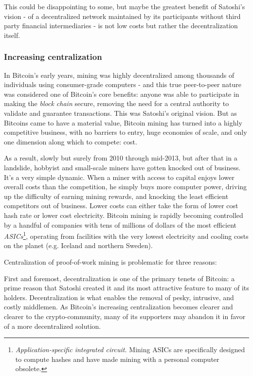 \documentclass[a4paper,11pt]{article}
\begin{document}
This could be disappointing to some, but maybe the greatest benefit of Satoshi's vision - of a decentralized network maintained by its participants without third party financial intermediaries - is not low costs but rather the decentralization itself.

\subsubsection{Increasing centralization}

In Bitcoin's early years, mining was highly decentralized among thousands of individuals using consumer-grade computers - and this true peer-to-peer nature was considered one of Bitcoin's core benefits: anyone was able to participate in making the \textit{block chain} secure, removing the need for a central authority to validate and guarantee transactions. This was Satoshi's original vision. But as Bitcoins came to have a material value, Bitcoin mining has turned into a highly competitive business, with no barriers to entry, huge economies of scale, and only one dimension along which to compete: cost.

As a result, slowly but surely from 2010 through mid-2013, but after that in a landslide, hobbyist and small-scale miners have gotten knocked out of business. It's a very simple dynamic. When a miner with access to capital enjoys lower overall costs than the competition, he simply buys more computer power, driving up the difficulty of earning mining rewards, and knocking the least efficient competitors out of business. Lower costs can either take the form of lower cost hash rate or lower cost electricity. Bitcoin mining is rapidly becoming controlled by a handful of companies with tens of millions of dollars of the most efficient \textit{ASICs}\footnote{\textit{Application-specific integrated circuit.} Mining ASICs are specifically designed to compute hashes and have made mining with a personal computer obsolete.}, operating from facilities with the very lowest electricity and cooling costs on the planet (e.g. Iceland and northern Sweden). 

Centralization of proof-of-work mining is problematic for three reasons: 

First and foremost, decentralization is one of the primary tenets of Bitcoin: a prime reason that Satoshi created it and its most attractive feature to many of its holders. Decentralization is what enables the removal of pesky, intrusive, and costly middlemen. As Bitcoin's increasing centralization becomes clearer and clearer to the crypto-community, many of its supporters may abandon it in favor of a more decentralized solution.
\end{document}
